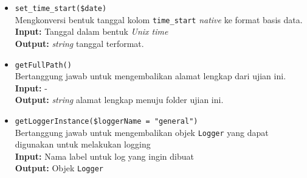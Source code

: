 \begin{itemize}
\begin{itemize}
                \item \texttt{set\_time\_start(\$date)} \\
                    Mengkonversi bentuk tanggal kolom \texttt{time\_start} \textit{native} ke 
                    format basis data. \\
                    \textbf{Input:} Tanggal dalam bentuk \textit{Unix time}\\
                    \textbf{Output:} \textit{string} tanggal terformat.
                
                \item \texttt{getFullPath()} \\
                    Bertanggung jawab untuk mengembalikan alamat lengkap dari ujian ini. \\
                    \textbf{Input:} -\\
                    \textbf{Output:} \textit{string} alamat lengkap menuju folder ujian ini.
                
                \item \texttt{getLoggerInstance(\$loggerName = "general")} \\
                    Bertanggung jawab untuk mengembalikan objek \texttt{Logger} yang dapat
                    digunakan untuk melakukan logging\\
                    \textbf{Input:} Nama label untuk log yang ingin dibuat\\
                    \textbf{Output:} Objek \texttt{Logger}
            \end{itemize}
            

\end{itemize}
